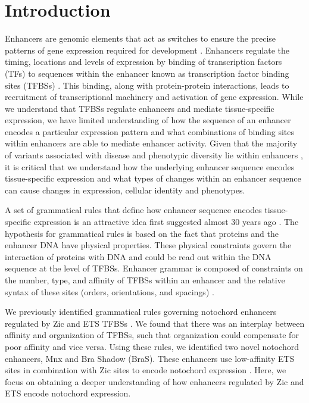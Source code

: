 \section{Introduction}

Enhancers are genomic elements that act as switches to ensure the precise patterns of gene expression required for development \cite{levine2010}. Enhancers regulate the timing, locations and levels of expression by binding of transcription factors (TFs) to sequences within the enhancer known as transcription factor binding sites (TFBSs) \cite{heinz2010,liu2012a,small1992,spitz2012,swanson2010a}. This binding, along with protein-protein interactions, leads to recruitment of transcriptional machinery and activation of gene expression. While we understand that TFBSs regulate enhancers and mediate tissue-specific expression, we have limited understanding of how the sequence of an enhancer encodes a particular expression pattern and what combinations of binding sites within enhancers are able to mediate enhancer activity. Given that the majority of variants associated with disease and phenotypic diversity lie within enhancers \cite{maurano2012,tak2015a,visel2009}, it is critical that we understand how the underlying enhancer sequence encodes tissue-specific expression and what types of changes within an enhancer sequence can cause changes in expression, cellular identity and phenotypes. 

A set of grammatical rules that define how enhancer sequence encodes tissue-specific expression is an attractive idea first suggested almost 30 years ago \cite{arnone1997,barolo2016a,levo2014,thanos1995}. The hypothesis for grammatical rules is based on the fact that proteins and the enhancer DNA have physical properties. These physical constraints govern the interaction of proteins with DNA and could be read out within the DNA sequence at the level of TFBSs. Enhancer grammar is composed of constraints on the number, type, and affinity of TFBSs within an enhancer and the relative syntax of these sites (orders, orientations, and spacings) \cite{jindal2021}.

We previously identified grammatical rules governing notochord enhancers regulated by Zic and ETS TFBSs \cite{farley2016}. We found that there was an interplay between affinity and organization of TFBSs, such that organization could compensate for poor affinity and vice versa. Using these rules, we identified two novel notochord enhancers, Mnx and Bra Shadow (BraS). These enhancers use low-affinity ETS sites in combination with Zic sites to encode notochord expression \cite{farley2016}. Here, we focus on obtaining a deeper understanding of how enhancers regulated by Zic and ETS encode notochord expression. 

